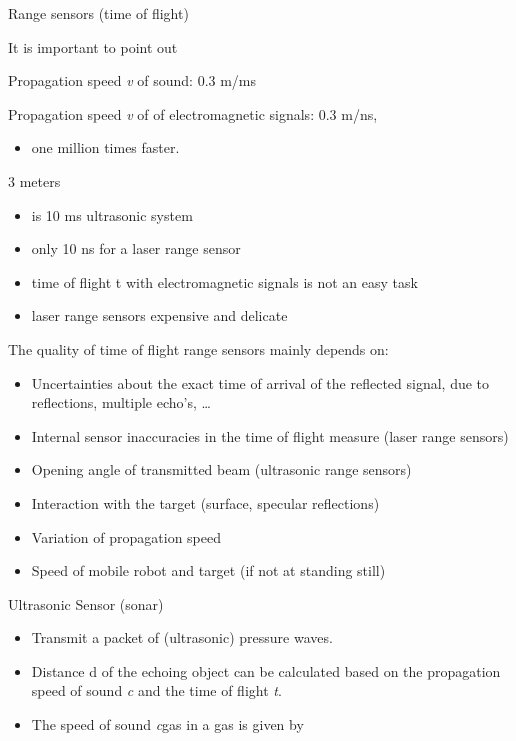 \documentclass[compress]{beamer}
\begin{document}
\begin{frame}{Range sensors (time of flight)}

It is important to point out

Propagation speed \emph{v} of sound: 0.3 m/ms

Propagation speed \emph{v} of of electromagnetic signals: 0.3 m/ns,

\begin{itemize}

\item
  one million times faster.
\end{itemize}

3 meters

\begin{itemize}

\item
  is 10 ms ultrasonic system
\item
  only 10 ns for a laser range sensor
\item
  time of flight t with electromagnetic signals is not an easy task
\item
  laser range sensors expensive and delicate
\end{itemize}

The quality of time of flight range sensors mainly depends on:

\begin{itemize}

\item
  Uncertainties about the exact time of arrival of the reflected signal,
  due to reflections, multiple echo's, \ldots{}
\item
  Internal sensor inaccuracies in the time of flight measure (laser
  range sensors)
\item
  Opening angle of transmitted beam (ultrasonic range sensors)
\item
  Interaction with the target (surface, specular reflections)
\item
  Variation of propagation speed
\item
  Speed of mobile robot and target (if not at standing still)
\end{itemize}

\end{frame}

\begin{frame}{Ultrasonic Sensor (sonar)}

\begin{itemize}

\item
  Transmit a packet of (ultrasonic) pressure waves.
\item
  Distance d of the echoing object can be calculated based on the
  propagation speed of sound \emph{c} and the time of flight \emph{t}.
\item
  The speed of sound \emph{c}gas in a gas is given by
\end{itemize}

\end{frame}
\end{document}
